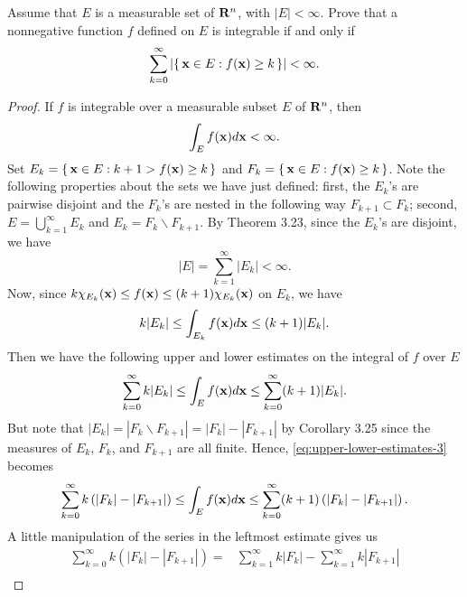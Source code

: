 \begin{problem}
Assume that $E$ is a measurable set of $\mathbf{R}^n$, with
$|E|<\infty$. Prove that a nonnegative function $f$ defined
on $E$ is integrable if and only if
\[
\sum_{k=0}^\infty\left|\left\{\,\mathbf{x}\in E:f(\mathbf{x})\geq
    k\,\right\}\right|<\infty.
\]
\end{problem}
\begin{proof}
If $f$ is integrable over a measurable subset $E$ of $\mathbf{R}^n$, then
\begin{equation}
\label{eq:integrability-3}
\int_E f(\mathbf{x}) d \mathbf{x}<\infty.
\end{equation}
Set $E_k=\left\{\,\mathbf{x}\in E:k+1>f(\mathbf{x})\geq k\,\right\}$ and
$F_k=\left\{\,\mathbf{x}\in E:f(\mathbf{x})\geq k\,\right\}$. Note the
following properties about the sets we have just defined: first, the
$E_k$'s are pairwise disjoint and the $F_k$'s are nested in the following
way $F_{k+1}\subset F_k$; second, $E=\bigcup_{k=1}^\infty E_k$ and
$E_k=F_k\smallsetminus F_{k+1}$. By Theorem 3.23, since the $E_k$'s are disjoint,
we have
\begin{equation}
  \label{eq:disjoint-measurable-sets-3}
|E|=\sum_{k=1}^\infty|E_k|<\infty.
\end{equation}
Now, since $k\chi_{E_k}(\mathbf{x})\leq f(\mathbf{x})\leq (k+1)\chi_{E_k}(\mathbf{x})$ on
$E_k$, we have
\begin{equation}
\label{eq:estimates-E-k-3}
k|E_k|\leq\int_{E_k}f(\mathbf{x}) d \mathbf{x}\leq (k+1)|E_k|.
\end{equation}
Then we have the following upper and lower estimates on the integral of $f$
over $E$
\begin{equation}
\label{eq:upper-lower-estimates-3}
\sum_{k=0}^\infty k|E_k|\leq\int_E f(\mathbf{x}) d \mathbf{x}\leq\sum_{k=0}^\infty(k+1)|E_k|.
\end{equation}
But note that $|E_k|=|F_k\smallsetminus F_{k+1}|=|F_k|-|F_{k+1}|$ by Corollary 3.25
since the measures of $E_k$, $F_k$, and $F_{k+1}$ are all finite. Hence,
\eqref{eq:upper-lower-estimates-3} becomes
\begin{equation}
\label{eq:new-upper-lower-estimates-3}
\sum_{k=0}^\infty k\left(|F_k|-|F_{k+1}|\right)\leq
\int_E f(\mathbf{x}) d \mathbf{x}\leq
\sum_{k=0}^\infty (k+1)\left(|F_k|-|F_{k+1}|\right).
\end{equation}
A little manipulation of the series in the leftmost estimate gives us
\begin{equation}
\label{eq:leftmost-estimate-3}
\begin{aligned}
\sum_{k=0}^\infty k\left(|F_k|-|F_{k+1}|\right)
={}&\sum_{k=1}^\infty k|F_k|-\sum_{k=1}^\infty k|F_{k+1}|\\

\end{aligned}
\end{equation}
\end{proof}
